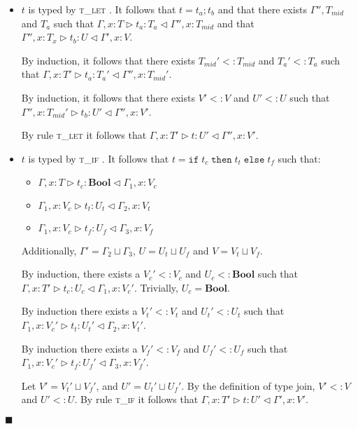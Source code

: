 \documentclass[preprint]{sigplanconf}
\newcommand{\lemref}[1]{Lemma \ref{#1}}
\newcommand{\tlet}{\textsc{t\_let} }
\newcommand{\tif}{\textsc{t\_if} }
\newcommand{\typerule}[4]{#1 \triangleright #2 : #3 \triangleleft #4}
\newcommand{\boolt}{\mathbf{Bool}}
\newcommand{\ift}[3]{\mathtt{if} \; #1 \; \mathtt{then} \; #2 \; \mathtt{else} \; #3}
\newcommand{\qed}{$\blacksquare$}
\newenvironment{proof}{\vspace{1ex}\noindent{\bf Proof}\hspace{0.5em}}
  {\hfill\qed\vspace{1ex}}
\begin{document}
\begin{proof}
\begin{itemize}
\begin{itemize}
	By \lemref{lem:weakening},
	$\typerule{\Gamma, x : T'}{t}{U}{\Gamma', x : T'}$.
	Let $V' = T'$ and $U' = U$. Reflexively, $V' <: V$ and $U' <: U$.

\end{itemize}

\item $t$ is typed by \tlet. It follows that $t = t_a ; t_b$ and 
that there exists
$\Gamma'', T_{mid}$ and $T_a$ 
such that $\typerule{\Gamma, x : T}{t_a}{T_a}{\Gamma'', x : T_{mid}}$
and that $\typerule{\Gamma'', x : T_x}{t_b}{U}{\Gamma', x : V}$.

By induction, it follows that there exists $T_{mid}' <: T_{mid}$
and $T_a' <: T_a$
such that $\typerule{\Gamma, x : T'}{t_a}{T_a'}{\Gamma'', x : T_{mid}'}$.

By induction, it follows that 
there exists $V' <: V$ 
and $U' <: U$
such that
$\typerule{\Gamma'', x : T_{mid}'}{t_b}{U'}{\Gamma'', x : V'}$.

By rule \tlet it follows that
$\typerule{\Gamma, x : T'}{t}{U'}{\Gamma'', x : V'}$.

\item $t$ is typed by \tif. It follows that $t = \ift{t_c}{t_t}{t_f}$ 
such that:

\begin{itemize}
\item $\typerule{\Gamma, x : T}{t_c}{\boolt}{\Gamma_1, x : V_c}$
\item $\typerule{\Gamma_1, x : V_c}{t_t}{U_t}{\Gamma_2, x : V_t}$
\item $\typerule{\Gamma_1, x : V_c}{t_f}{U_f}{\Gamma_3, x : V_f}$
\end{itemize}

Additionally, $\Gamma' = \Gamma_2 \sqcup \Gamma_3$, 
$U = U_t \sqcup U_f$ and
$V = V_t \sqcup V_f$.

By induction, there exists a $V_c' <: V_c$
and $U_c <: \boolt$
such that $\typerule{\Gamma, x : T'}{t_c}{U_c}{\Gamma_1, x : V_c'}$.
Trivially, $U_c = \boolt$.

By induction there exists a 
$V_t' <: V_t$ and $U_t' <: U_t$ such that
$\typerule{\Gamma_1, x : V_c'}{t_t}{U_t'}{\Gamma_2, x : V_t'}$.

By induction there exists a 
$V_f' <: V_f$ and $U_f' <: U_f$
such that $\typerule{\Gamma_1, x : V_c'}{t_f}{U_f'}{\Gamma_3, x : V_f'}$.

Let $V' = V_t' \sqcup V_f'$, and $U' = U_t' \sqcup U_f'$.
By the definition of type join, $V' <: V$ and $U' <: U$.
By rule \tif it follows that
$\typerule{\Gamma, x : T'}{t}{U'}{\Gamma', x : V'}$.


\end{itemize}
\end{proof}
\end{document}
